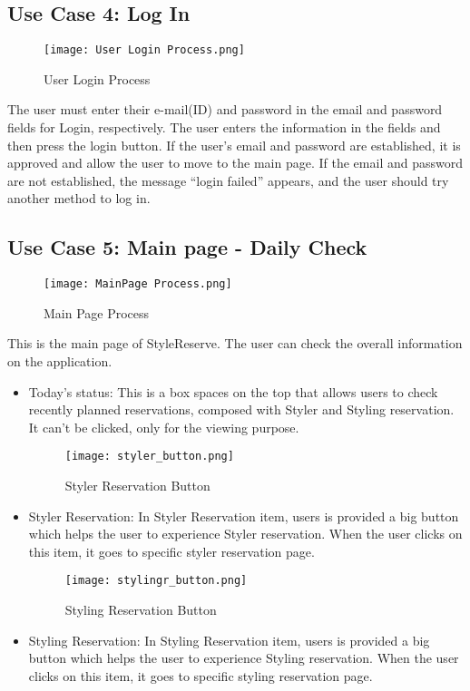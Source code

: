 \documentclass[conference]{IEEEtran}
\begin{document}
\subsection{Use Case 4: Log In}
    \begin{figure}[htbp]
    \centerline{\texttt{[image: User Login Process.png]}}
    \label{fig}
    \caption{User Login Process}
    \end{figure}
The user must enter their e-mail(ID) and password in the email and password fields for Login, respectively. The user enters the information in the fields and then press the login button. If the user’s email and password are established, it is approved and allow the user to move to the main page. If the email and password are not established, the message “login failed” appears, and the user should try another method to log in.\\
    
\subsection{Use Case 5: Main page - Daily Check}
    \begin{figure}[htbp]
    \centerline{\texttt{[image: MainPage Process.png]}}
    \label{fig}
    \caption{Main Page Process}
    \end{figure}
This is the main page of StyleReserve. The user can check the overall information on the application.\\
\begin{itemize}
    \begin{figure}[htbp]
    \centerline{\texttt{[image: main\_page\_top\_box.png]}}
    \label{fig}
    \caption{Main Page Top Box}
    \end{figure}
    \item Today’s status: This is a box spaces on the top that allows users to check recently planned reservations, composed with Styler and Styling reservation. It can’t be clicked, only for the viewing purpose.\\
    
     \begin{figure}[htbp]
    \centerline{\texttt{[image: styler\_button.png]}}
    \label{fig}
    \caption{Styler Reservation Button}
    \end{figure}
    \item Styler Reservation: In Styler Reservation item, users is provided a big button which helps the user to experience Styler reservation. When the user clicks on this item, it goes to specific styler reservation page.
    
    \begin{figure}[htbp]
    \centerline{\texttt{[image: stylingr\_button.png]}}
    \label{fig}
    \caption{Styling Reservation Button}
    \end{figure}
    \item Styling Reservation: In Styling Reservation item, users is provided a big button which helps the user to experience Styling reservation. When the user clicks on this item, it goes to specific styling reservation page.\\
\end{itemize}
\end{document}
